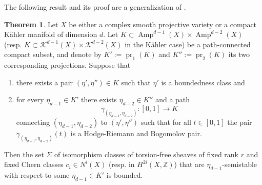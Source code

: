 \documentclass[a4,reqno]{amsart}
\theoremstyle{definition}
\newtheorem{theorem}{Theorem}[section]
\def\cK{\mathcal K}
\newcommand{\Z}{\mathbb{Z}}
\DeclareMathOperator{\Amp}{Amp}
\DeclareMathOperator{\pr}{pr}
\numberwithin{equation}{section}
\begin{document}
The following result and its proof are a generalization of \cite[Proposition 6.3]{GrebToma}.
\begin{theorem}\label{thm:MainBound}
Let $X$ be either a complex smooth projective variety or a compact K\"ahler manifold of dimension $d$. Let $K \subset \Amp^{d-1}(X) \times \Amp^{d-2}(X)$ (resp. $K \subset \cK^{d-1}(X) \times \cK^{d-2}(X)$ in the K\"ahler case) be a path-connected compact subset, and denote by $K' := \pr_1(K)$ and $K'' := \pr_2(K)$ its two corresponding projections. Suppose that

\begin{enumerate}
    \item there exists a pair $(\eta',\eta'') \in K$ such that $\eta'$ is a boundedness class and
    \item for every $\eta_{d-1} \in K'$ there exists $\eta_{d-2} \in K''$ and a path $$\gamma_{(\eta_{d-1},\eta_{d-2})} : [0,1] \to K$$ connecting $(\eta_{d-1},\eta_{d-2})$ to $(\eta',\eta'')$ such that for all $t \in [0,1]$ the pair $\gamma_{(\eta_{d-1},\eta_{d-2})}(t)$ is a Hodge-Riemann and Bogomolov pair. 
\end{enumerate}
Then the set $\Sigma$ of isomorphism classes of torsion-free sheaves of fixed rank $r$ and fixed Chern classes $c_i \in N^i(X)$ (resp. in $H^{2i}(X,\Z)$) that are $\eta_{d-1}$-semistable with respect to some $\eta_{d-1}\in K'$ is bounded.
\end{theorem}
\end{document}
